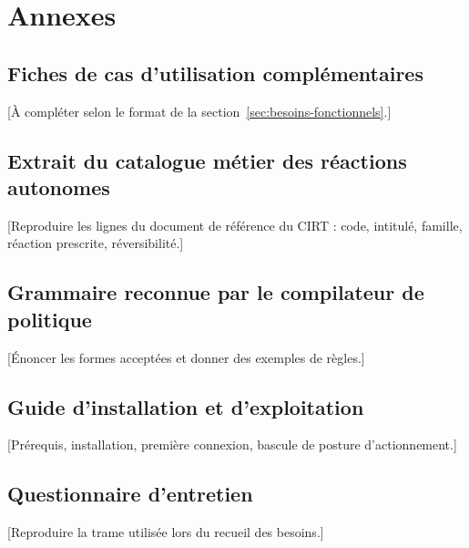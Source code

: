 \let\textcircled=\pgftextcircled
\chapter{Annexes}
\label{ann:annexes}

\section{Fiches de cas d'utilisation compl\'ementaires}
\label{ann:cas-utilisation}
[\`A compl\'eter selon le format de la section~\ref{sec:besoins-fonctionnels}.]

\section{Extrait du catalogue m\'etier des r\'eactions autonomes}
[Reproduire les lignes du document de r\'ef\'erence du CIRT : code, intitul\'e, famille,
r\'eaction prescrite, r\'eversibilit\'e.]

\section{Grammaire reconnue par le compilateur de politique}
[\'Enoncer les formes accept\'ees et donner des exemples de r\`egles.]

\section{Guide d'installation et d'exploitation}
[Pr\'erequis, installation, premi\`ere connexion, bascule de posture d'actionnement.]

\section{Questionnaire d'entretien}
[Reproduire la trame utilis\'ee lors du recueil des besoins.]
